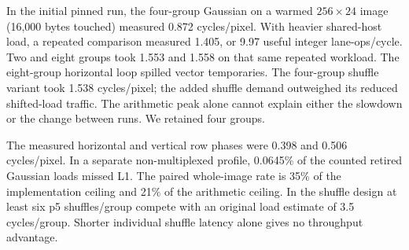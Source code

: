In the initial pinned run, the four-group Gaussian on a warmed $256\times24$ image (16,000 bytes touched) measured 0.872 cycles/pixel. With heavier shared-host load, a repeated comparison measured 1.405, or 9.97 useful integer lane-ops/cycle. Two and eight groups took 1.553 and 1.558 on that same repeated workload. The eight-group horizontal loop spilled vector temporaries. The four-group shuffle variant took 1.538 cycles/pixel; the added shuffle demand outweighed its reduced shifted-load traffic. The arithmetic peak alone cannot explain either the slowdown or the change between runs. We retained four groups.

The measured horizontal and vertical row phases were 0.398 and 0.506 cycles/pixel. In a separate non-multiplexed profile, 0.0645\% of the counted retired Gaussian loads missed L1. The paired whole-image rate is 35\% of the implementation ceiling and 21\% of the arithmetic ceiling. In the shuffle design at least six p5 shuffles/group compete with an original load estimate of 3.5 cycles/group. Shorter individual shuffle latency alone gives no throughput advantage.
